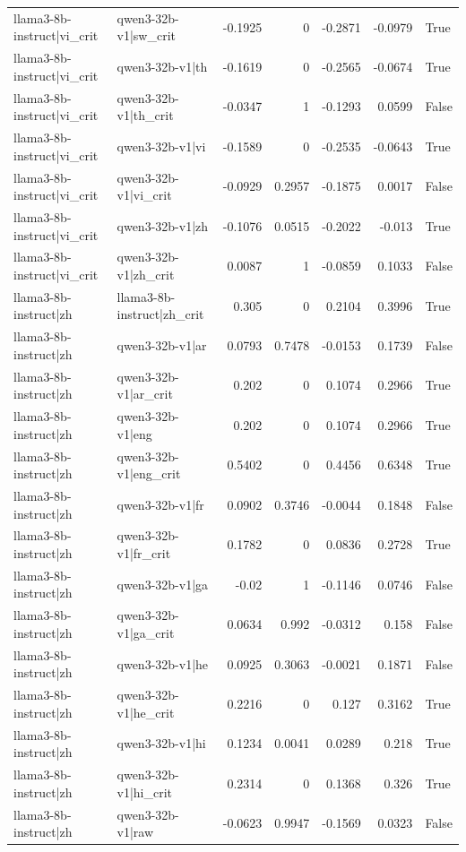 \begin{table}
\begin{tabular}{l l r r r r l}
llama3-8b-instruct|vi_crit & qwen3-32b-v1|sw_crit & -0.1925 & 0 & -0.2871 & -0.0979 & True \\
llama3-8b-instruct|vi_crit & qwen3-32b-v1|th & -0.1619 & 0 & -0.2565 & -0.0674 & True \\
llama3-8b-instruct|vi_crit & qwen3-32b-v1|th_crit & -0.0347 & 1 & -0.1293 & 0.0599 & False \\
llama3-8b-instruct|vi_crit & qwen3-32b-v1|vi & -0.1589 & 0 & -0.2535 & -0.0643 & True \\
llama3-8b-instruct|vi_crit & qwen3-32b-v1|vi_crit & -0.0929 & 0.2957 & -0.1875 & 0.0017 & False \\
llama3-8b-instruct|vi_crit & qwen3-32b-v1|zh & -0.1076 & 0.0515 & -0.2022 & -0.013 & True \\
llama3-8b-instruct|vi_crit & qwen3-32b-v1|zh_crit & 0.0087 & 1 & -0.0859 & 0.1033 & False \\
llama3-8b-instruct|zh & llama3-8b-instruct|zh_crit & 0.305 & 0 & 0.2104 & 0.3996 & True \\
llama3-8b-instruct|zh & qwen3-32b-v1|ar & 0.0793 & 0.7478 & -0.0153 & 0.1739 & False \\
llama3-8b-instruct|zh & qwen3-32b-v1|ar_crit & 0.202 & 0 & 0.1074 & 0.2966 & True \\
llama3-8b-instruct|zh & qwen3-32b-v1|eng & 0.202 & 0 & 0.1074 & 0.2966 & True \\
llama3-8b-instruct|zh & qwen3-32b-v1|eng_crit & 0.5402 & 0 & 0.4456 & 0.6348 & True \\
llama3-8b-instruct|zh & qwen3-32b-v1|fr & 0.0902 & 0.3746 & -0.0044 & 0.1848 & False \\
llama3-8b-instruct|zh & qwen3-32b-v1|fr_crit & 0.1782 & 0 & 0.0836 & 0.2728 & True \\
llama3-8b-instruct|zh & qwen3-32b-v1|ga & -0.02 & 1 & -0.1146 & 0.0746 & False \\
llama3-8b-instruct|zh & qwen3-32b-v1|ga_crit & 0.0634 & 0.992 & -0.0312 & 0.158 & False \\
llama3-8b-instruct|zh & qwen3-32b-v1|he & 0.0925 & 0.3063 & -0.0021 & 0.1871 & False \\
llama3-8b-instruct|zh & qwen3-32b-v1|he_crit & 0.2216 & 0 & 0.127 & 0.3162 & True \\
llama3-8b-instruct|zh & qwen3-32b-v1|hi & 0.1234 & 0.0041 & 0.0289 & 0.218 & True \\
llama3-8b-instruct|zh & qwen3-32b-v1|hi_crit & 0.2314 & 0 & 0.1368 & 0.326 & True \\
llama3-8b-instruct|zh & qwen3-32b-v1|raw & -0.0623 & 0.9947 & -0.1569 & 0.0323 & False \\

\end{tabular}
\end{table}
